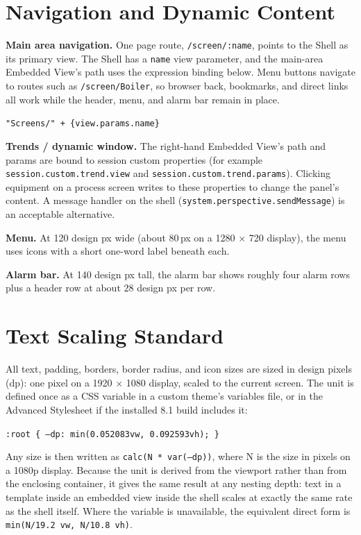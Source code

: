 \section{Navigation and Dynamic Content}
\textbf{Main area navigation.} One page route, \texttt{/screen/:name}, points to the Shell as its primary view. The Shell has a \texttt{name} view parameter, and the main-area Embedded View's path uses the expression binding below. Menu buttons navigate to routes such as \texttt{/screen/Boiler}, so browser back, bookmarks, and direct links all work while the header, menu, and alarm bar remain in place.
\begin{center}\texttt{"Screens/" + \{view.params.name\}}\end{center}

\textbf{Trends / dynamic window.} The right-hand Embedded View's path and params are bound to session custom properties (for example \texttt{session.\allowbreak{}custom.\allowbreak{}trend.\allowbreak{}view} and \texttt{session.\allowbreak{}custom.\allowbreak{}trend.\allowbreak{}params}). Clicking equipment on a process screen writes to these properties to change the panel's content. A message handler on the shell (\texttt{system.\allowbreak{}perspective.\allowbreak{}sendMessage}) is an acceptable alternative.

\textbf{Menu.} At 120 design px wide (about 80\,px on a 1280 $\times$ 720 display), the menu uses icons with a short one-word label beneath each.

\textbf{Alarm bar.} At 140 design px tall, the alarm bar shows roughly four alarm rows plus a header row at about 28 design px per row.

\section{Text Scaling Standard}
All text, padding, borders, border radius, and icon sizes are sized in design pixels (dp): one pixel on a 1920 $\times$ 1080 display, scaled to the current screen. The unit is defined once as a CSS variable in a custom theme's variables file, or in the Advanced Stylesheet if the installed 8.1 build includes it:
\begin{center}\texttt{:root \{ --dp: min(0.052083vw, 0.092593vh); \}}\end{center}
Any size is then written as \texttt{calc(N * var(--dp))}, where N is the size in pixels on a 1080p display. Because the unit is derived from the viewport rather than from the enclosing container, it gives the same result at any nesting depth: text in a template inside an embedded view inside the shell scales at exactly the same rate as the shell itself. Where the variable is unavailable, the equivalent direct form is \texttt{min(N/\allowbreak{}19.\allowbreak{}2 vw, N/\allowbreak{}10.\allowbreak{}8 vh)}.


